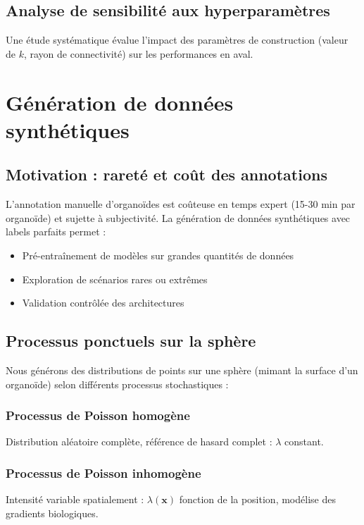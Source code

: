 \subsection{Analyse de sensibilité aux hyperparamètres}

Une étude systématique évalue l'impact des paramètres de construction (valeur de $k$, rayon de connectivité) sur les performances en aval.

\section{Génération de données synthétiques}

\subsection{Motivation : rareté et coût des annotations}

L'annotation manuelle d'organoïdes est coûteuse en temps expert (15-30 min par organoïde) et sujette à subjectivité. La génération de données synthétiques avec labels parfaits permet :
\begin{itemize}
    \item Pré-entraînement de modèles sur grandes quantités de données
    \item Exploration de scénarios rares ou extrêmes
    \item Validation contrôlée des architectures
\end{itemize}

\subsection{Processus ponctuels sur la sphère}

Nous générons des distributions de points sur une sphère (mimant la surface d'un organoïde) selon différents processus stochastiques :

\subsubsection{Processus de Poisson homogène}
Distribution aléatoire complète, référence de hasard complet : $\lambda$ constant.

\subsubsection{Processus de Poisson inhomogène}
Intensité variable spatialement : $\lambda(\mathbf{x})$ fonction de la position, modélise des gradients biologiques.

